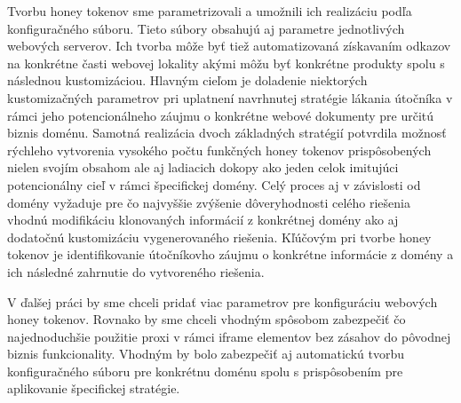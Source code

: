 \documentclass[conference, 11pt,slovak,a4paper,twoside]{IEEEtran}
\begin{document}
Tvorbu honey tokenov sme parametrizovali a umožnili ich realizáciu podľa konfiguračného súboru. Tieto súbory obsahujú aj parametre jednotlivých webových serverov. Ich tvorba môže byť tiež automatizovaná získavaním odkazov na konkrétne časti webovej lokality akými môžu byť konkrétne produkty spolu s následnou kustomizáciou. Hlavným cieľom je doladenie niektorých kustomizačných parametrov pri uplatnení navrhnutej stratégie lákania útočníka v rámci jeho potencionálneho záujmu o konkrétne webové dokumenty pre určitú biznis doménu. Samotná realizácia dvoch základných stratégií potvrdila možnosť rýchleho vytvorenia vysokého počtu funkčných honey tokenov prispôsobených nielen svojím obsahom ale aj ladiacich dokopy ako jeden celok imitujúci potencionálny cieľ v rámci špecifickej domény. Celý proces aj v závislosti od domény vyžaduje pre čo najvyššie zvýšenie dôveryhodnosti celého riešenia vhodnú modifikáciu klonovaných informácií z konkrétnej domény ako aj dodatočnú kustomizáciu vygenerovaného riešenia. Kľúčovým pri tvorbe honey tokenov je identifikovanie útočníkovho záujmu o konkrétne informácie z domény a ich následné zahrnutie do vytvoreného riešenia.

V ďalšej práci by sme chceli pridať viac parametrov pre konfiguráciu webových honey tokenov. Rovnako by sme chceli vhodným spôsobom zabezpečiť čo najednoduchšie použitie proxi v rámci iframe elementov bez zásahov do pôvodnej biznis funkcionality. Vhodným by bolo zabezpečiť aj automatickú tvorbu konfiguračného súboru pre konkrétnu doménu spolu s prispôsobením pre aplikovanie špecifickej stratégie.


\end{document}
